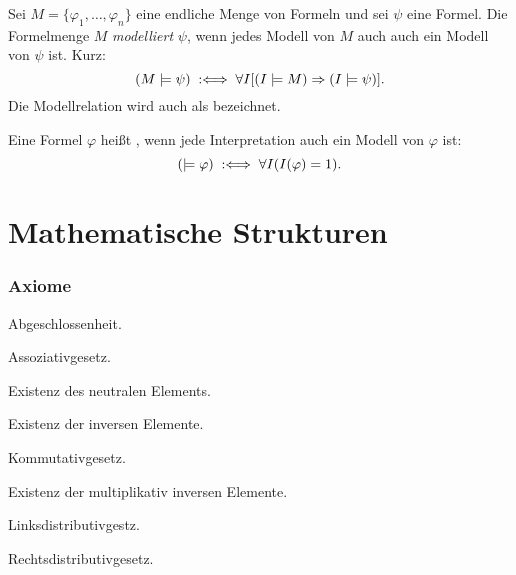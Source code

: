 \begin{definition}[Modellrelation]
Sei $M=\{\varphi_1,\ldots,\varphi_n\}$ eine endliche Menge
von Formeln und sei $\psi$ eine Formel. Die Formelmenge $M$
\emph{modelliert} $\psi$, wenn jedes Modell
von $M$ auch auch ein Modell von $\psi$ ist. Kurz:
\begin{equation}
(M\models\psi) \;:\Longleftrightarrow\; \forall I[(I\models M)\Rightarrow (I\models\psi)].
\end{equation}
Die Modellrelation wird auch als  bezeichnet.
\end{definition}

\begin{definition}[Tautologie]
Eine Formel $\varphi$ heißt ,
wenn jede Interpretation auch ein Modell von $\varphi$ ist:
\begin{equation}
(\models\varphi) \;:\Longleftrightarrow\; \forall I(I(\varphi)=1).
\end{equation}
\end{definition}

\newpage
\section{Mathematische Strukturen}\label{sec:Strukturen}
\subsubsection*{Axiome}

\noindent{} Abgeschlossenheit.

\noindent{} Assoziativgesetz.

\noindent{} Existenz des neutralen Elements.

\noindent{} Existenz der inversen Elemente.

\noindent{} Kommutativgesetz.

\noindent
{} Existenz der multiplikativ inversen Elemente.

\noindent{} Linksdistributivgestz.

\noindent{} Rechtsdistributivgesetz.

